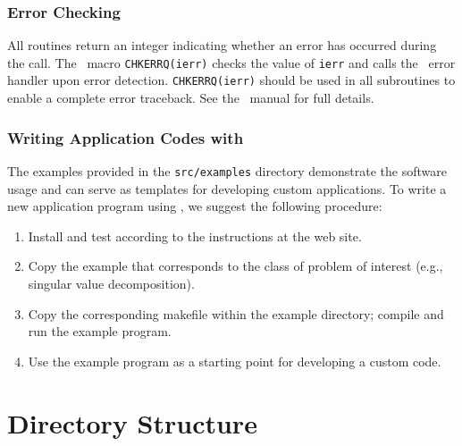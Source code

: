 \subsubsection*{Error Checking}

All \slepc routines return an integer indicating whether an error
has occurred during the call.  The \petsc\ macro \Verb!CHKERRQ(ierr)!
checks the value of \Verb!ierr! and calls the \petsc\ error handler
upon error detection.  \Verb!CHKERRQ(ierr)! should be used in all
subroutines to enable a complete error traceback. See the \petsc\ manual 
for full details.

\subsubsection*{Writing Application Codes with \slepc}

The examples provided in the \Verb!src/examples! directory demonstrate the software usage
and can serve as templates for developing
custom applications.
To write a new application program using \slepc, we suggest the
following procedure:
\begin{enumerate}
\item Install and test \slepc according to the instructions at the \slepc web site.
\item Copy the \slepc example 
      that corresponds to the class of problem of interest (e.g.,
      singular value decomposition).
\item Copy the corresponding makefile within the example directory;
      compile and run the example program.
\item Use the example program as a starting point for developing a custom code.
\end{enumerate}


\section{Directory Structure}

